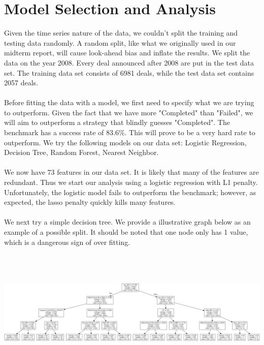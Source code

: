 \documentclass[a4paper]{article}
\begin{document}
\section{Model Selection and Analysis }
\label{sec:model}

Given the time series nature of the data, we couldn't split the training and testing data  randomly. A random split, like what we originally used in our midterm report, will cause look-ahead bias and inflate the results. We split the data on the year 2008. Every deal announced after 2008 are put in the test data set. The training data set consists of 6981 deals, while the test data set contains 2057 deals.
\\
\\
Before fitting the data with a model, we first need to specify what we are trying to outperform. Given the fact that we have more "Completed" than "Failed", we will aim to outperform a strategy that blindly guesses "Completed". The benchmark has a success rate of 83.6\%. This will prove to be a very hard rate to outperform. We try the following models on our data set: Logistic Regression, Decision Tree, Random Forest, Nearest Neighbor.
\\
\\
We now have 73 features in our data set. It is likely that many of the features are redundant. Thus we start our analysis using a logistic regression with L1 penalty. Unfortunately, the logistic model fails to outperform the benchmark; however, as expected, the lasso penalty quickly kills many features. 
\\
\\
We next try a simple decision tree. We provide a illustrative graph below as an example of a possible split. It should be noted that one node only has 1 value, which is a dangerous sign of over fitting. 
\\
\\
\begin{center}
\includegraphics[width=14cm, height=5cm]{tree.png} 

\end{center}
\end{document}
